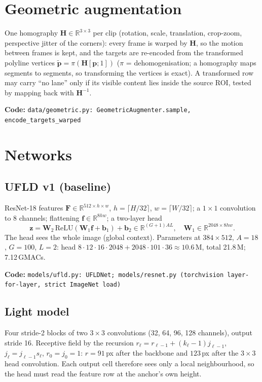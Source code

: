 \documentclass[10pt,a4paper]{article}
\newcommand{\impl}[1]{\par\noindent\textcolor{blue!50!black}{\small\textbf{Code:} \texttt{#1}}\par}
\newcommand{\R}{\mathbb{R}}
\theoremstyle{definition}
\begin{document}
\section{Geometric augmentation}
One homography $\bm H\in\R^{3\times3}$ per clip (rotation, scale, translation, crop-zoom, perspective jitter of the
corners): every frame is warped by $\bm H$, so the motion between frames is kept, and the targets are re-encoded
from the transformed polyline vertices $\tilde{\bm p}=\pi(\bm H[\bm p;1])$ ($\pi$ = dehomogenisation; a
homography maps segments to segments, so transforming the vertices is exact). A transformed row may carry ``no
lane'' only if its visible content lies inside the source ROI, tested by mapping back with $\bm H^{-1}$.
\impl{data/geometric.py: GeometricAugmenter.sample, encode\_targets\_warped}

\section{Networks}
\subsection{UFLD v1 (baseline)}
ResNet-18 features $\bm F\in\R^{512\times h\times w}$, $h=\lceil H/32\rceil$, $w=\lceil W/32\rceil$; a $1{\times}1$
convolution to 8 channels; flattening $\bm f\in\R^{8hw}$; a two-layer head
\begin{equation}
\bm z=\bm W_2\,\mathrm{ReLU}(\bm W_1\bm f+\bm b_1)+\bm b_2\in\R^{(G+1)AL},\quad \bm W_1\in\R^{2048\times 8hw}.
\end{equation}
The head sees the whole image (global context). Parameters at $384{\times}512$, $A=18$, $G=100$, $L=2$: head
$8\cdot12\cdot16\cdot2048+2048\cdot101\cdot36\approx10.6$\,M, total 21.8\,M; 7.12\,GMACs.
\impl{models/ufld.py: UFLDNet; models/resnet.py (torchvision layer-for-layer, strict ImageNet load)}

\subsection{Light model}
Four stride-2 blocks of two $3{\times}3$ convolutions (32, 64, 96, 128 channels), output stride 16. Receptive field
by the recursion $r_\ell=r_{\ell-1}+(k_\ell-1)j_{\ell-1}$, $j_\ell=j_{\ell-1}s_\ell$, $r_0=j_0=1$: $r=91$\,px after the
backbone and $123$\,px after the $3{\times}3$ head convolution. Each output cell therefore sees only a local
neighbourhood, so the head must read the feature row at the anchor's own height.
\end{document}
